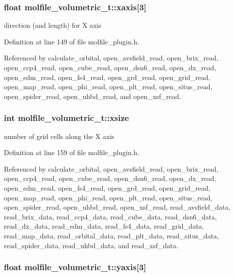 \subsubsection{\setlength{\rightskip}{0pt plus 5cm}float molfile\_\-volumetric\_\-t::xaxis[3]}\label{structmolfile__volumetric__t_m2}


direction (and length) for X axis 

Definition at line 149 of file molfile\_\-plugin.h.

Referenced by calculate\_\-orbital, open\_\-avsfield\_\-read, open\_\-brix\_\-read, open\_\-ccp4\_\-read, open\_\-cube\_\-read, open\_\-dsn6\_\-read, open\_\-dx\_\-read, open\_\-edm\_\-read, open\_\-fs4\_\-read, open\_\-grd\_\-read, open\_\-grid\_\-read, open\_\-map\_\-read, open\_\-phi\_\-read, open\_\-plt\_\-read, open\_\-situs\_\-read, open\_\-spider\_\-read, open\_\-uhbd\_\-read, and open\_\-xsf\_\-read.
\subsubsection{\setlength{\rightskip}{0pt plus 5cm}int molfile\_\-volumetric\_\-t::xsize}\label{structmolfile__volumetric__t_m5}


number of grid cells along the X axis 

Definition at line 159 of file molfile\_\-plugin.h.

Referenced by calculate\_\-orbital, open\_\-avsfield\_\-read, open\_\-brix\_\-read, open\_\-ccp4\_\-read, open\_\-cube\_\-read, open\_\-dsn6\_\-read, open\_\-dx\_\-read, open\_\-edm\_\-read, open\_\-fs4\_\-read, open\_\-grd\_\-read, open\_\-grid\_\-read, open\_\-map\_\-read, open\_\-phi\_\-read, open\_\-plt\_\-read, open\_\-situs\_\-read, open\_\-spider\_\-read, open\_\-uhbd\_\-read, open\_\-xsf\_\-read, read\_\-avsfield\_\-data, read\_\-brix\_\-data, read\_\-ccp4\_\-data, read\_\-cube\_\-data, read\_\-dsn6\_\-data, read\_\-dx\_\-data, read\_\-edm\_\-data, read\_\-fs4\_\-data, read\_\-grid\_\-data, read\_\-map\_\-data, read\_\-orbital\_\-data, read\_\-plt\_\-data, read\_\-situs\_\-data, read\_\-spider\_\-data, read\_\-uhbd\_\-data, and read\_\-xsf\_\-data.
\subsubsection{\setlength{\rightskip}{0pt plus 5cm}float molfile\_\-volumetric\_\-t::yaxis[3]}\label{structmolfile__volumetric__t_m3}


